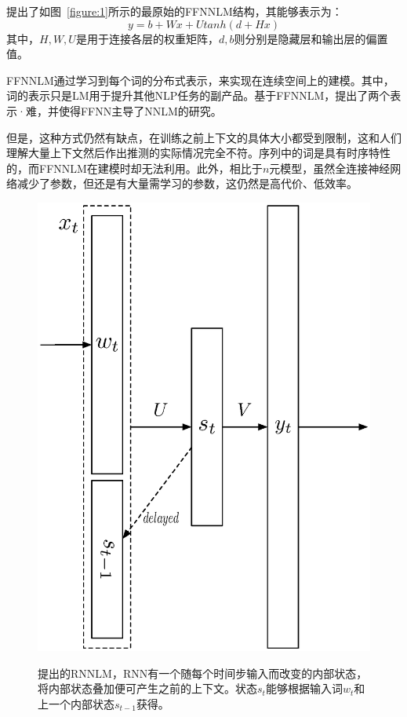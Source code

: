 \documentclass[a4paper, 12pt, twocolumn]{article}
\newcommand{\figref}[1]{图~\ref{#1}}
\begin{document}
\cite{bengio2003quick}提出了如\figref{figure:1}所示的最原始的FFNNLM结构，其能够表示为：
\begin{equation}
  y=b+Wx+U tanh(d+Hx)
  \label{eq:4}
\end{equation}
其中，$H,W,U$是用于连接各层的权重矩阵，$d,b$则分别是隐藏层和输出层的偏置值。

FFNNLM通过学习到每个词的分布式表示，来实现在连续空间上的建模。其中，词的表示只是LM用于提升其他NLP任务的副产品。基于FFNNLM，\cite{mikolov2013efficient}提出了两个表示·难，并使得FFNN主导了NNLM的研究。

但是，这种方式仍然有缺点，在训练之前上下文的具体大小都受到限制，这和人们理解大量上下文然后作出推测的实际情况完全不符。序列中的词是具有时序特性的，而FFNNLM在建模时却无法利用。此外，相比于$n$元模型，虽然全连接神经网络减少了参数，但还是有大量需学习的参数，这仍然是高代价、低效率。

\begin{figure}[!htp]
  \centering
  \includegraphics[width=.8\columnwidth]{figure-2.eps}
  \label{figure:2}
  \caption{\cite{mikolov2010recurrent,mikolov2011rnnlm}提出的RNNLM，RNN有一个随每个时间步输入而改变的内部状态，将内部状态叠加便可产生之前的上下文。状态$s_t$能够根据输入词$w_t$和上一个内部状态$s_{t-1}$获得。}
\end{figure}
\end{document}
